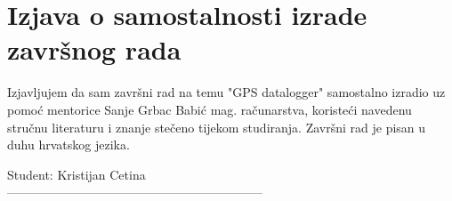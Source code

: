 \section*{Izjava o samostalnosti izrade završnog rada}
Izjavljujem da sam završni rad na temu "GPS datalogger" samostalno izradio uz pomoć mentorice Sanje Grbac Babić mag. računarstva, koristeći navedenu stručnu literaturu i znanje stečeno tijekom studiranja. Završni rad je pisan u duhu hrvatskog jezika.
\vspace{\fill}
\begin{flushright}
Student: Kristijan Cetina\\
\vspace{15mm}
--------------------------------------------------------------
\end{flushright}